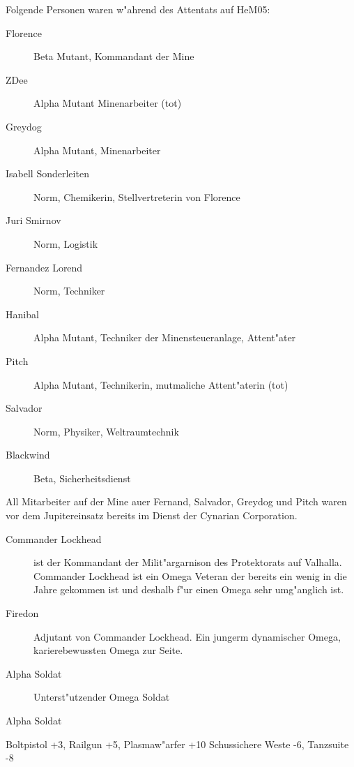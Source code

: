 Folgende Personen waren w"ahrend des Attentats auf HeM05:

\begin{description}
    \item[Florence] Beta Mutant, Kommandant der Mine    
    \item[ZDee] Alpha Mutant Minenarbeiter (tot)
    \item[Greydog] Alpha Mutant, Minenarbeiter
    \item[Isabell Sonderleiten] Norm, Chemikerin, Stellvertreterin von Florence
    \item[Juri Smirnov] Norm, Logistik
    \item[Fernandez Lorend] Norm, Techniker
    \item[Hanibal] Alpha Mutant, Techniker der Minensteueranlage, Attent"ater
    \item[Pitch] Alpha Mutant, Technikerin, mutma\3liche Attent"aterin (tot)
    \item[Salvador] Norm, Physiker, Weltraumtechnik
    \item[Blackwind] Beta, Sicherheitsdienst
\end{description}

All Mitarbeiter auf der Mine au\3er Fernand, Salvador, Greydog und Pitch waren vor dem Jupitereinsatz bereits im Dienst der Cynarian Corporation.



\begin{description}
    \item[Commander Lockhead] ist der Kommandant der Milit"argarnison des Protektorats auf Valhalla. Commander Lockhead ist ein Omega Veteran der bereits ein wenig in die Jahre gekommen ist und deshalb f"ur einen Omega sehr umg"anglich ist. 
    \item[Firedon] Adjutant von Commander Lockhead. Ein jungerm dynamischer Omega, karierebewussten Omega zur Seite.
    \item[Alpha Soldat] Unterst"utzender Omega Soldat
\end{description}

\begin{nscsheet}{Alpha Soldat}
    \nscstats[ATT=7,AGG=7,EMP=4,KNO=3,HP=13]
    \nscruler
    \begin{nscinventory}
        \nscitem[Waffen] Boltpistol +3, Railgun +5, Plasmaw"arfer +10
        \nscitem[R"ustung] Schussichere Weste -6, Tanzsuite -8
    \end{nscinventory}
\end{nscsheet}


